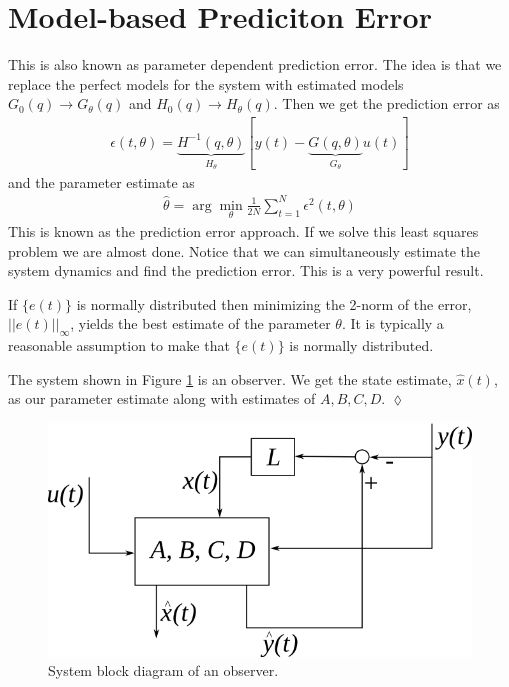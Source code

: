 \section{Model-based Prediciton Error}
This is also known as parameter dependent prediction error. The idea is that we replace the perfect models for the system with estimated models $G_0(q)\rightarrow G_\theta(q)$ and $H_0(q)\rightarrow H_\theta(q)$. Then we get the prediction error as
\begin{align}
\boxed{\epsilon(t,\theta) = \underbrace{H^{-1}(q,\theta)}_{H_\theta}[y(t)-\underbrace{G(q,\theta)}_{G_\theta}u(t)]}
\end{align}
and the parameter estimate as
\begin{align}
\boxed{\hat{\theta} = \arg\min_{\theta}\frac{1}{2N}\sum_{t=1}^N\epsilon^2(t,\theta)}
\end{align}
This is known as the prediction error approach. If we solve this least squares problem we are almost done. Notice that we can simultaneously estimate the system dynamics and find the prediction error. This is a very powerful result.

If $\{e(t)\}$ is normally distributed then minimizing the 2-norm of the error, $||e(t)||_\infty$, yields the best estimate of the parameter $\theta$. It is typically a reasonable assumption to make that $\{e(t)\}$ is normally distributed.

\begin{example}
The system shown in Figure \ref{fig:12block3} is an observer. We get the state estimate, $\hat{x}(t)$, as our parameter estimate along with estimates of $A,B,C,D$.
$\lozenge$
\end{example}

\begin{figure}[ht!]
	\centering
	\includegraphics[width=.6\textwidth]{images/12block3}
	\caption{System block diagram of an observer.}
	\label{fig:12block3}
\end{figure}

